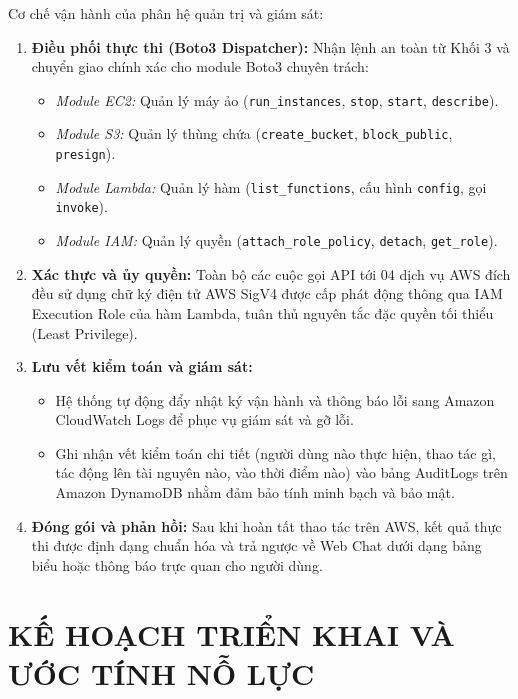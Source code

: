 \documentclass[a4paper,12pt]{article}
\begin{document}
Cơ chế vận hành của phân hệ quản trị và giám sát:
\begin{enumerate}
  \item \textbf{Điều phối thực thi (Boto3 Dispatcher):} Nhận lệnh an toàn từ Khối 3 và chuyển giao chính xác cho module Boto3 chuyên trách:
  \begin{itemize}
    \item \textit{Module EC2:} Quản lý máy ảo (\texttt{run\_instances}, \texttt{stop}, \texttt{start}, \texttt{describe}).
    \item \textit{Module S3:} Quản lý thùng chứa (\texttt{create\_bucket}, \texttt{block\_public}, \texttt{presign}).
    \item \textit{Module Lambda:} Quản lý hàm (\texttt{list\_functions}, cấu hình \texttt{config}, gọi \texttt{invoke}).
    \item \textit{Module IAM:} Quản lý quyền (\texttt{attach\_role\_policy}, \texttt{detach}, \texttt{get\_role}).
  \end{itemize}
  \item \textbf{Xác thực và ủy quyền:} Toàn bộ các cuộc gọi API tới 04 dịch vụ AWS đích đều sử dụng chữ ký điện tử AWS SigV4 được cấp phát động thông qua IAM Execution Role của hàm Lambda, tuân thủ nguyên tắc đặc quyền tối thiểu (Least Privilege).
  \item \textbf{Lưu vết kiểm toán và giám sát:}
  \begin{itemize}
    \item Hệ thống tự động đẩy nhật ký vận hành và thông báo lỗi sang Amazon CloudWatch Logs để phục vụ giám sát và gỡ lỗi.
    \item Ghi nhận vết kiểm toán chi tiết (người dùng nào thực hiện, thao tác gì, tác động lên tài nguyên nào, vào thời điểm nào) vào bảng AuditLogs trên Amazon DynamoDB nhằm đảm bảo tính minh bạch và bảo mật.
  \end{itemize}
  \item \textbf{Đóng gói và phản hồi:} Sau khi hoàn tất thao tác trên AWS, kết quả thực thi được định dạng chuẩn hóa và trả ngược về Web Chat dưới dạng bảng biểu hoặc thông báo trực quan cho người dùng.
\end{enumerate}

\clearpage

\section{KẾ HOẠCH TRIỂN KHAI VÀ ƯỚC TÍNH NỖ LỰC}
\end{document}
